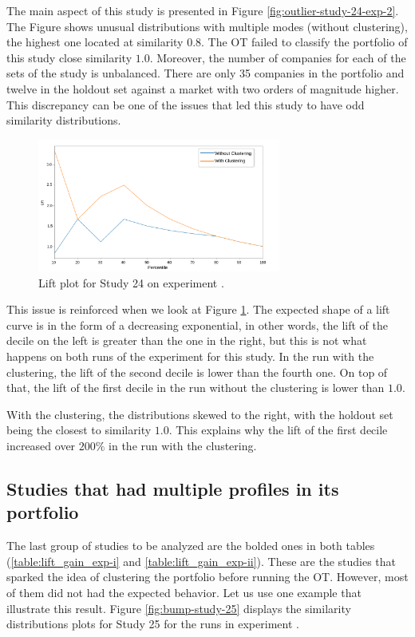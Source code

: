 The main aspect of this study is presented in Figure \ref{fig:outlier-study-24-exp-2}. The Figure shows unusual distributions with multiple modes (without clustering), the highest one located at similarity $0.8$. The OT failed to classify the portfolio of this study close similarity $1.0$. Moreover, the number of companies for each of the sets of the study is unbalanced. There are only 35 companies in the portfolio and twelve in the holdout set against a market with two orders of magnitude higher. This discrepancy can be one of the issues that led this study to have odd similarity distributions.

\begin{figure}[!ht]
   \centering
   \includegraphics[width=8cm]{fig/ch4-outlier-study-24-lift-exp-2.png}
   \caption{Lift plot for Study 24 on experiment \nameExperimentII{}.}
   \label{fig:outlier-study-24-lift-exp-2}
\end{figure}

This issue is reinforced when we look at Figure \ref{fig:outlier-study-24-lift-exp-2}. The expected shape of a lift curve is in the form of a decreasing exponential, in other words, the lift of the decile on the left is greater than the one in the right, but this is not what happens on both runs of the experiment for this study. In the run with the clustering, the lift of the second decile is lower than the fourth one. On top of that, the lift of the first decile in the run without the clustering is lower than $1.0$. 

With the clustering, the distributions skewed to the right, with the holdout set being the closest to similarity $1.0$. This explains why the lift of the first decile increased over $200\%$ in the run with the clustering.

\subsection{Studies that had multiple profiles in its portfolio}

The last group of studies to be analyzed are the bolded ones in both tables (\ref{table:lift_gain_exp-i} and \ref{table:lift_gain_exp-ii}). These are the studies that sparked the idea of clustering the portfolio before running the OT. However, most of them did not had the expected behavior. Let us use one example that illustrate this result. Figure \ref{fig:bump-study-25} displays the similarity distributions plots for Study 25 for the runs in experiment \nameExperimentII{}. 

